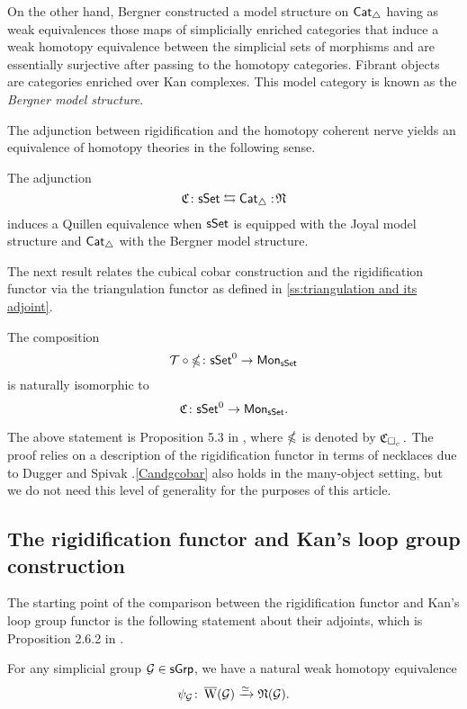 On the other hand, Bergner constructed a model structure on $\mathsf{Cat}_{\triangle}$ having as weak equivalences those maps of simplicially enriched categories that induce a weak homotopy equivalence between the simplicial sets of morphisms and are essentially surjective after passing to the homotopy categories.
Fibrant objects are categories enriched over Kan complexes.
This model category is known as the \textit{Bergner model structure}.

The adjunction between rigidification and the homotopy coherent nerve yields an equivalence of homotopy theories in the following sense.

\begin{proposition} \label{joyalbergner}
	The adjunction
	$$\operatorname{\mathfrak{C}} \colon \mathsf{sSet} \leftrightarrows \mathsf{Cat}_{\triangle} :\!\operatorname{\mathfrak{N}}$$
	induces a Quillen equivalence when $\mathsf{sSet}$ is equipped with the Joyal model structure and $\mathsf{Cat}_{\triangle}$ with the Bergner model structure.
\end{proposition}

The next result relates the cubical cobar construction and the rigidification functor via the triangulation functor as defined in  \cref{ss:triangulation and its adjoint}.

\begin{proposition} \label{Candgcobar}
	The composition 
	$$\mathcal{T} \circ \operatorname{\mathbb{\Omega}} \colon \mathsf{sSet}^0 \to \mathsf{Mon}_{\mathsf{sSet}}$$
	is naturally isomorphic to
	$$\operatorname{\mathfrak{C}} \colon \mathsf{sSet}^0 \to \mathsf{Mon}_{\mathsf{sSet}}.$$
\end{proposition}

The above statement is Proposition 5.3 in \cite{rivera2018cubical}, where $\operatorname{\mathbb{\Omega}}$ is denoted by $\operatorname{\mathfrak{C}}_{\square_c}.$ The proof relies on a description of the rigidification functor in terms of necklaces due to Dugger and Spivak \cite{dugger2011rigidification}.\cref{Candgcobar} also holds in the many-object setting, but we do not need this level of generality for the purposes of this article.

\subsection{The rigidification functor and Kan's loop group construction}

The starting point of the comparison between the rigidification functor and Kan's loop group functor is the following statement about their adjoints, which is Proposition 2.6.2 in \cite{hinich2007deformation}.

\begin{proposition} \label{hinich}
	For any simplicial group $\mathcal{G} \in \mathsf{sGrp}$, we have a natural weak homotopy equivalence
	$$\psi_{\mathcal{G}} \colon \operatorname{\overline{W}}(\mathcal{G}) \xrightarrow{\simeq} \operatorname{\mathfrak{N}}(\mathcal{G}).$$
\end{proposition} 

